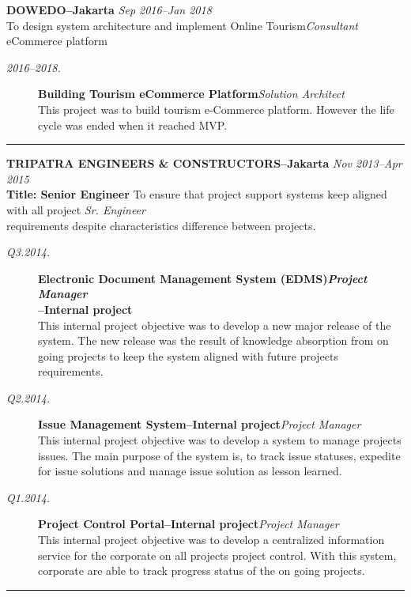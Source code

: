 \documentclass[12pt]{res} %
\begin{document}
\begin{resume}
{\bf \uppercase{Dowedo}--Jakarta} \hfill {\sl Sep 2016--Jan 2018} \\
To design system architecture and implement Online Tourism\hfill {\sl Consultant}\\eCommerce platform 

\vspace{10pt} 
\begin{description}
    \item[{\sl {\footnotesize 2016--2018}.}] {\bf Building Tourism eCommerce Platform}\hfill {\sl Solution Architect}\\
    This project was to build tourism e-Commerce platform. However the life cycle was ended when it reached MVP.
\end{description}
\begin{center}
	\rule{0.5\textwidth}{.2pt}
\end{center}

{\bf \uppercase{TRIPATRA ENGINEERS \& CONSTRUCTORS}--Jakarta} \hfill {\sl Nov 2013--Apr 2015} \\[2pt]
{\bf Title: Senior Engineer} 
To ensure that project support systems keep aligned with all project \hfill {\sl Sr. Engineer}\\
requirements despite characteristics difference between projects.

\vspace{10pt} 
\begin{description}
    \item[{\sl {\footnotesize Q3.2014}.}] {\bf Electronic Document Management System (EDMS)\hfill {\sl Project Manager}\\--Internal project}\\
    This internal project objective was to develop a new major release of the system. The new release
    was the result of knowledge absorption from on going projects to keep the system
    aligned with future projects requirements.
    \item[{\sl {\footnotesize Q2.2014}.}] {\bf Issue Management System--Internal project}\hfill {\sl Project Manager}\\
    This internal project objective was to develop a system to manage projects issues. The main purpose of the system is, to track issue statuses, 
    expedite for issue solutions and manage issue solution as lesson learned. 
    \item[{\sl {\footnotesize Q1.2014}.}] {\bf Project Control Portal--Internal project}\hfill {\sl Project Manager}\\
    This internal project objective was to develop a centralized information service for the corporate on all projects project control. 
    With this system, corporate are able to track progress status of the on going projects.
\end{description}
\begin{center}
	\rule{0.5\textwidth}{.2pt}
\end{center}
 

\end{resume}
\end{document}

